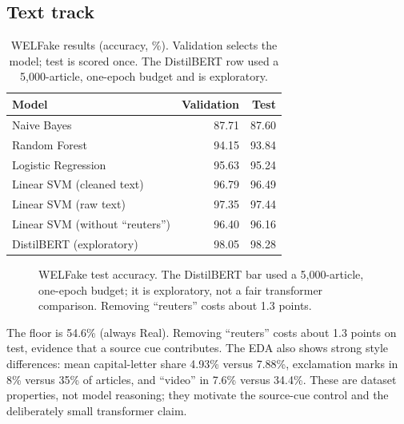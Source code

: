 \documentclass[11pt]{article}
\begin{document}
\subsection{Text track}

\begin{table}[t]
\centering
\small
\caption{WELFake results (accuracy, \%). Validation selects the model; test is scored once. The DistilBERT row used a 5{,}000-article, one-epoch budget and is exploratory.}
\label{tab:text}
\begin{tabular}{@{}lrr@{}}
\toprule
\textbf{Model} & \textbf{Validation} & \textbf{Test} \\
\midrule
Naive Bayes & 87.71 & 87.60 \\
Random Forest & 94.15 & 93.84 \\
Logistic Regression & 95.63 & 95.24 \\
Linear SVM (cleaned text) & 96.79 & 96.49 \\
Linear SVM (raw text) & 97.35 & 97.44 \\
Linear SVM (without ``reuters'') & 96.40 & 96.16 \\
DistilBERT (exploratory) & 98.05 & 98.28 \\
\bottomrule
\end{tabular}
\end{table}


\begin{figure}[t]
\centering
{}
\caption{WELFake test accuracy. The DistilBERT bar used a 5{,}000-article, one-epoch budget; it is exploratory, not a fair transformer comparison. Removing ``reuters'' costs about 1.3 points.}
\label{fig:textbars}
\end{figure}

The floor is 54.6\% (always Real). Removing ``reuters'' costs about 1.3 points on test, evidence that a source cue contributes. The EDA also shows strong style differences: mean capital-letter share 4.93\% versus 7.88\%, exclamation marks in 8\% versus 35\% of articles, and ``video'' in 7.6\% versus 34.4\%. These are dataset properties, not model reasoning; they motivate the source-cue control and the deliberately small transformer claim.
\end{document}
